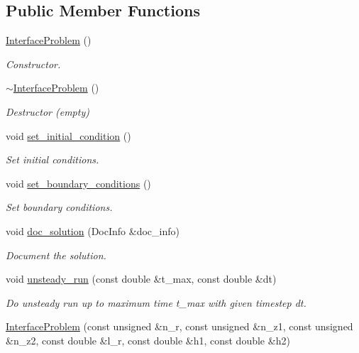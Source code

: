 \subsection*{Public Member Functions}
\begin{DoxyCompactItemize}
\item 
\hyperlink{classInterfaceProblem_a5889be7fc8eab5d222f1bfb750c845ba}{Interface\+Problem} ()
\begin{DoxyCompactList}\small\item\em Constructor. \end{DoxyCompactList}\item 
\hyperlink{classInterfaceProblem_a90c191f8046069099b199743e7ce7111}{$\sim$\+Interface\+Problem} ()
\begin{DoxyCompactList}\small\item\em Destructor (empty) \end{DoxyCompactList}\item 
void \hyperlink{classInterfaceProblem_a0d3af8378c4f0a6e38636be958c300d5}{set\+\_\+initial\+\_\+condition} ()
\begin{DoxyCompactList}\small\item\em Set initial conditions. \end{DoxyCompactList}\item 
void \hyperlink{classInterfaceProblem_a844445832ad7a32aa9f5d03ffdb40ebb}{set\+\_\+boundary\+\_\+conditions} ()
\begin{DoxyCompactList}\small\item\em Set boundary conditions. \end{DoxyCompactList}\item 
void \hyperlink{classInterfaceProblem_a49714e35e94f7d2af0b6ddd22b851f52}{doc\+\_\+solution} (Doc\+Info \&doc\+\_\+info)
\begin{DoxyCompactList}\small\item\em Document the solution. \end{DoxyCompactList}\item 
void \hyperlink{classInterfaceProblem_adf1f4e43d10939e4323e0e315b711085}{unsteady\+\_\+run} (const double \&t\+\_\+max, const double \&dt)
\begin{DoxyCompactList}\small\item\em Do unsteady run up to maximum time t\+\_\+max with given timestep dt. \end{DoxyCompactList}\item 
\hyperlink{classInterfaceProblem_ab476bae8faf34f3238b31564d31a4795}{Interface\+Problem} (const unsigned \&n\+\_\+r, const unsigned \&n\+\_\+z1, const unsigned \&n\+\_\+z2, const double \&l\+\_\+r, const double \&h1, const double \&h2)

\end{DoxyCompactItemize}

